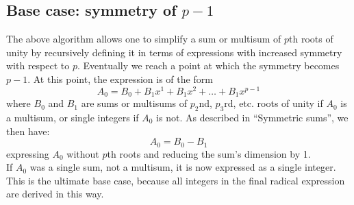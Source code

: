 \documentclass{article}
\begin{document}
\subsection{Base case: symmetry of $ p - 1 $}
    The above algorithm allows one to simplify a sum or multisum of $ p $th roots of unity by recursively defining it in terms of expressions with increased symmetry with respect to $ p $. Eventually we reach a point at which the symmetry becomes $ p - 1 $. At this point, the expression is of the form
    $$ A_0 = B_0 + B_1 x^1 + B_1 x^2 + \dots + B_1 x^{p - 1} $$
    where $ B_0 $ and $ B_1 $ are sums or multisums of $ p_2 $nd, $ p_3 $rd, etc. roots of unity if $ A_0 $ is a multisum, or single integers if $ A_0 $ is not. As described in ``Symmetric sums'', we then have:
    $$ A_0 = B_0 - B_1 $$
    expressing $ A_0 $ without $ p $th roots and reducing the sum's dimension by 1.\\
    If $ A_0 $ was a single sum, not a multisum, it is now expressed as a single integer. This is the ultimate base case, because all integers in the final radical expression are derived in this way.\\
\end{document}
